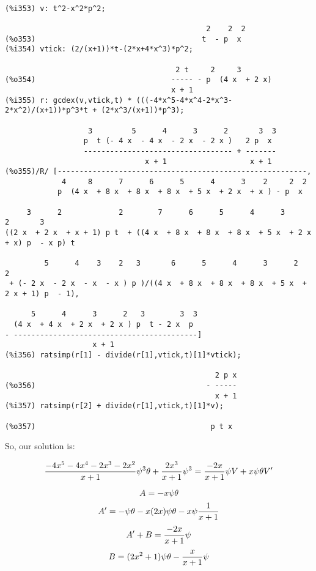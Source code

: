 {\small\begin{verbatim}

(%i353) v: t^2-x^2*p^2;

                                              2    2  2
(%o353)                                      t  - p  x
(%i354) vtick: (2/(x+1))*t-(2*x+4*x^3)*p^2;

                                       2 t     2     3
(%o354)                               ----- - p  (4 x  + 2 x)
                                      x + 1
(%i355) r: gcdex(v,vtick,t) * (((-4*x^5-4*x^4-2*x^3-2*x^2)/(x+1))*p^3*t + (2*x^3/(x+1))*p^3);

                   3         5      4      3      2       3  3
                  p  t (- 4 x  - 4 x  - 2 x  - 2 x )   2 p  x
                  ---------------------------------- + -------
                                x + 1                   x + 1
(%o355)/R/ [---------------------------------------------------------,
             4     8      7      6      5      4      3    2     2  2
            p  (4 x  + 8 x  + 8 x  + 8 x  + 5 x  + 2 x  + x ) - p  x

     3      2             2        7      6      5      4      3      2       3
((2 x  + 2 x  + x + 1) p t  + ((4 x  + 8 x  + 8 x  + 8 x  + 5 x  + 2 x  + x) p  - x p) t

         5      4    3    2   3       6      5      4      3      2             2
 + (- 2 x  - 2 x  - x  - x ) p )/((4 x  + 8 x  + 8 x  + 8 x  + 5 x  + 2 x + 1) p  - 1),

      5      4      3      2   3        3  3
  (4 x  + 4 x  + 2 x  + 2 x ) p  t - 2 x  p
- ------------------------------------------]
                    x + 1
(%i356) ratsimp(r[1] - divide(r[1],vtick,t)[1]*vtick);

                                                2 p x
(%o356)                                       - -----
                                                x + 1
(%i357) ratsimp(r[2] + divide(r[1],vtick,t)[1]*v);

(%o357)                                        p t x

\end{verbatim}}

So, our solution is:

$${{{-4x^5-4x^4-2x^3-2x^2}\over{x+1}}\psi^3\theta + {{2x^3}\over{x+1}}\psi^3}
  = {-2x\over{x+1}}\psi V + x\psi\theta V'$$

$$A = -x\psi\theta$$
$$A' = -\psi\theta - x(2x)\psi\theta - x\psi{1\over{x+1}}$$
$$A' + B = {-2x\over{x+1}}\psi$$
$$B = (2x^2+1)\psi\theta - {x\over{x+1}}\psi$$

